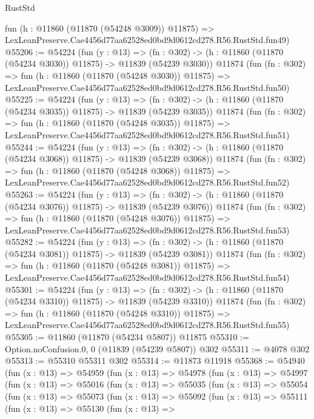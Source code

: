 \begin{lexlean}{RustStd}
\begin{coremodule}
    fun (h : @11860 (@11870 (@54248 @3009)) @11875) =>
    LexLeanPreserve.Cae4456d77aa62528ed0bd9d0612cd278.R56.RustStd.fun49)
@55206 := @54224
    (fun (y : @13) =>
    (fn : @302) -> (h : @11860 (@11870 (@54234 @3030)) @11875) -> @11839 (@54239 @3030))
    @11874
    (fun (fn : @302) =>
    fun (h : @11860 (@11870 (@54248 @3030)) @11875) =>
    LexLeanPreserve.Cae4456d77aa62528ed0bd9d0612cd278.R56.RustStd.fun50)
@55225 := @54224
    (fun (y : @13) =>
    (fn : @302) -> (h : @11860 (@11870 (@54234 @3035)) @11875) -> @11839 (@54239 @3035))
    @11874
    (fun (fn : @302) =>
    fun (h : @11860 (@11870 (@54248 @3035)) @11875) =>
    LexLeanPreserve.Cae4456d77aa62528ed0bd9d0612cd278.R56.RustStd.fun51)
@55244 := @54224
    (fun (y : @13) =>
    (fn : @302) -> (h : @11860 (@11870 (@54234 @3068)) @11875) -> @11839 (@54239 @3068))
    @11874
    (fun (fn : @302) =>
    fun (h : @11860 (@11870 (@54248 @3068)) @11875) =>
    LexLeanPreserve.Cae4456d77aa62528ed0bd9d0612cd278.R56.RustStd.fun52)
@55263 := @54224
    (fun (y : @13) =>
    (fn : @302) -> (h : @11860 (@11870 (@54234 @3076)) @11875) -> @11839 (@54239 @3076))
    @11874
    (fun (fn : @302) =>
    fun (h : @11860 (@11870 (@54248 @3076)) @11875) =>
    LexLeanPreserve.Cae4456d77aa62528ed0bd9d0612cd278.R56.RustStd.fun53)
@55282 := @54224
    (fun (y : @13) =>
    (fn : @302) -> (h : @11860 (@11870 (@54234 @3081)) @11875) -> @11839 (@54239 @3081))
    @11874
    (fun (fn : @302) =>
    fun (h : @11860 (@11870 (@54248 @3081)) @11875) =>
    LexLeanPreserve.Cae4456d77aa62528ed0bd9d0612cd278.R56.RustStd.fun54)
@55301 := @54224
    (fun (y : @13) =>
    (fn : @302) -> (h : @11860 (@11870 (@54234 @3310)) @11875) -> @11839 (@54239 @3310))
    @11874
    (fun (fn : @302) =>
    fun (h : @11860 (@11870 (@54248 @3310)) @11875) =>
    LexLeanPreserve.Cae4456d77aa62528ed0bd9d0612cd278.R56.RustStd.fun55)
@55305 := @11860 (@11870 (@54234 @5807)) @11875
@55310 := Option.noConfusion.{0, 0} (@11839 (@54239 @5807)) @302
@55311 := @4078 @302
@55313 := @55310 @55311 @302
@55314 := @11873 @11918
@55368 := @54940
    (fun (x : @13) =>
    @54959
      (fun (x : @13) =>
      @54978
        (fun (x : @13) =>
        @54997
          (fun (x : @13) =>
          @55016
            (fun (x : @13) =>
            @55035
              (fun (x : @13) =>
              @55054
                (fun (x : @13) =>
                @55073
                  (fun (x : @13) =>
                  @55092
                    (fun (x : @13) =>
                    @55111
                      (fun (x : @13) =>
                      @55130
                        (fun (x : @13) =>

\end{coremodule}
\end{lexlean}
